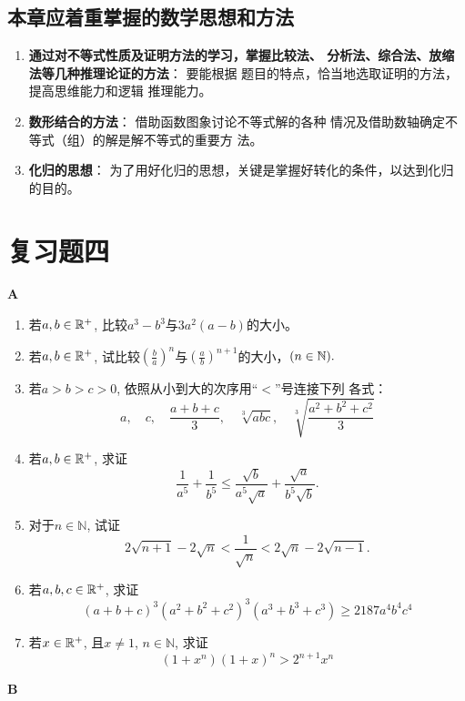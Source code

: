 \subsection*{本章应着重掌握的数学思想和方法}
\begin{enumerate}
\item \textbf{通过对不等式性质及证明方法的学习，掌握比较法、
分析法、综合法、放缩法等几种推理论证的方法}：  要能根据
题目的特点，恰当地选取证明的方法，提高思维能力和逻辑
推理能力。
\item \textbf{数形结合的方法}： 借助函数图象讨论不等式解的各种
情况及借助数轴确定不等式（组）的解是解不等式的重要方
法。
\item \textbf{化归的思想}： 为了用好化归的思想，关键是掌握好转化的条件，以达到化归的目的。
\end{enumerate}

\section*{复习题四}
\begin{center}
    \bfseries A
\end{center}

\begin{enumerate}
\item 若$a,b\in \mathbb{R}^+$, 比较$a^3-b^3$与$3a^2(a-b)$的大小。
\item 若$a,b\in \mathbb{R}^+$, 试比较$\left(\frac ba\right)^n$与$\left(\frac ab\right)^{n+1}$的大小，$(n\in \mathbb{N}).$

\item 若$a>b>c>0$, 依照从小到大的次序用“$<$”号连接下列
各式：
$$a,\quad c,\quad \frac{a+b+c}3,\quad \sqrt[3]{abc},\quad \sqrt[3]{\frac{a^2+b^2+c^2}3}$$
\item 若$a,b\in \mathbb{R}^+$, 求证
$$\frac{1}{a^5}+\frac{1}{b^5}\leqslant\frac{\sqrt{b}}{a^5\sqrt{a}}+\frac{\sqrt{a}}{b^5\sqrt{b}}.$$
\item 对于$n\in\mathbb{N}$, 试证
$$2\sqrt{n+1}-2\sqrt{n}<\frac{1}{\sqrt{n}}<2\sqrt{n}-2\sqrt{n-1}.$$
\item 若$a,b,c\in \mathbb{R}^+$, 求证
$$(a+b+c)^{3}(a^{2}+b^{2}+c^{2})^{3}(a^{3}+b^{3}+c^{3})\geq 2187a^{4}b^{4}c^{4}$$

\item 若$x\in \mathbb{R}^+$, 且$x\neq1$, $n\in\mathbb{N}$, 求证
$$(1+x^n)(1+x)^n>2^{n+1}x^n$$
\end{enumerate}

\begin{center}
    \bfseries B
\end{center}

